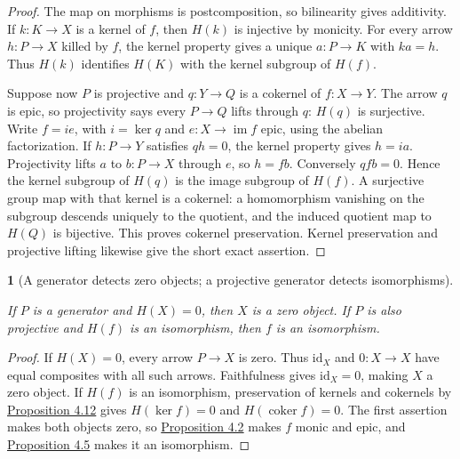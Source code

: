 \documentclass[11pt,a4paper]{article}
\newcommand{\mathheading}{}
\theoremstyle{plain}
\newtheorem*{plainstatement}{\mathheading}
\theoremstyle{definition}
\newenvironment{mathstatement}[3]{\renewcommand{\mathheading}{#1 #2}\begin{plainstatement}[#3]}{\end{plainstatement}}
\begin{document}
\begin{proof}

The map on morphisms is postcomposition, so bilinearity gives additivity. If \(k:K\to X\) is a kernel of \(f\), then \(H(k)\) is injective by monicity. For every arrow \(h:P\to X\) killed by \(f\), the kernel property gives a unique \(a:P\to K\) with \(ka=h\). Thus \(H(k)\) identifies \(H(K)\) with the kernel subgroup of \(H(f)\).


Suppose now \(P\) is projective and \(q:Y\to Q\) is a cokernel of \(f:X\to Y\). The arrow \(q\) is epic, so projectivity says every \(P\to Q\) lifts through \(q\): \(H(q)\) is surjective. Write \(f=i e\), with \(i=\ker q\) and \(e:X\to\operatorname{im}f\) epic, using the abelian factorization. If \(h:P\to Y\) satisfies \(qh=0\), the kernel property gives \(h=i a\). Projectivity lifts \(a\) to \(b:P\to X\) through \(e\), so \(h=fb\). Conversely \(qfb=0\). Hence the kernel subgroup of \(H(q)\) is the image subgroup of \(H(f)\). A surjective group map with that kernel is a cokernel: a homomorphism vanishing on the subgroup descends uniquely to the quotient, and the induced quotient map to \(H(Q)\) is bijective. This proves cokernel preservation. Kernel preservation and projective lifting likewise give the short exact assertion.


\end{proof}
 
\begin{mathstatement}{Proposition}{4.13}{A generator detects zero objects; a projective generator detects isomorphisms}
\label{env-4-13}

If \(P\) is a generator and \(H(X)=0\), then \(X\) is a zero object. If \(P\) is also projective and \(H(f)\) is an isomorphism, then \(f\) is an isomorphism.


\par{}\par

\end{mathstatement}
 
\begin{proof}

If \(H(X)=0\), every arrow \(P\to X\) is zero. Thus \(\mathrm{id}_X\) and \(0:X\to X\) have equal composites with all such arrows. Faithfulness gives \(\mathrm{id}_X=0\), making \(X\) a zero object. If \(H(f)\) is an isomorphism, preservation of kernels and cokernels by \hyperref[env-4-12]{Proposition 4.12} gives \(H(\ker f)=0\) and \(H(\operatorname{coker}f)=0\). The first assertion makes both objects zero, so \hyperref[env-4-2]{Proposition 4.2} makes \(f\) monic and epic, and \hyperref[env-4-5]{Proposition 4.5} makes it an isomorphism.


\end{proof}
 
\end{document}
